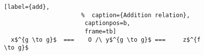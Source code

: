\begin{figure}[!t]
  \centering
  \begin{minipage}{\columnwidth}
    \begin{lstlisting}[label={add},
                      %  caption={Addition relation},
                       captionpos=b,
                       frame=tb]
  x$^{g \to g}$  ===    O /\ y$^{g \to g}$ ===     z$^{f \to g}$
    \end{lstlisting}
  \end{minipage}
\end{figure}